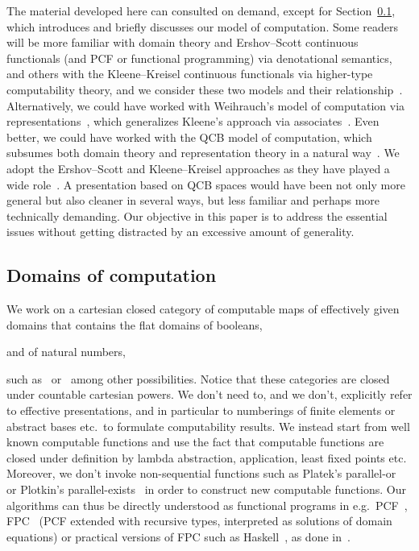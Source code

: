 \documentclass{LMCS}
\begin{document}
The material developed here can consulted on demand, except for
Section~\ref{domains}, which introduces and briefly discusses our
model of computation. Some readers will be more familiar with domain
theory and Ershov--Scott continuous functionals (and PCF or functional
programming) via denotational semantics, and others with the
Kleene--Kreisel continuous functionals via higher-type computability
theory, and we consider these two models and their
relationship~\cite{normann:computer}.  Alternatively, we could have
worked with Weihrauch's model of computation via
representations~\cite{weihrauch:analysis}, which generalizes Kleene's
approach via associates~\cite{normann:recursion}.  Even better, we
could have worked with the QCB model of computation, which subsumes
both domain theory and representation theory in a natural
way~\cite{MR2328287,MR1948051}. We adopt the Ershov--Scott and
Kleene--Kreisel approaches as they have played a wide
role~\cite{normann:computer}. A presentation based on QCB spaces would
have been not only more general but also cleaner in several ways, but
less familiar and perhaps more technically demanding.  Our objective
in this paper is to address the essential issues without getting
distracted by an excessive amount of generality.

\subsection{Domains of computation} \label{domains}

We work on a cartesian closed category of computable maps of
effectively given domains that contains the flat domains of booleans,

and of natural numbers, 
 
such as~\cite{egli:constable} or~\cite{smyth:effectively} among other
possibilities. Notice that these categories are closed under countable
cartesian powers. We don't need to, and we don't, explicitly refer to
effective presentations, and in particular to numberings of finite
elements or abstract bases etc.\ to formulate computability results.
We instead start from well known computable functions and use the fact
that computable functions are closed under definition by lambda
abstraction, application, least fixed points etc.  Moreover, we don't
invoke non-sequential functions such as Platek's
parallel-or~\cite{scott:lcf} or Plotkin's
parallel-exists~\cite{plotkin:lcf} in order to construct new
computable functions. Our algorithms can thus be directly understood
as functional programs in e.g.\ PCF~\cite{plotkin:lcf},
FPC~\cite{plotkin:domains} (PCF extended with recursive types,
interpreted as solutions of domain equations) or practical versions of
FPC such as Haskell~\cite{bird,haskell:hutton}, as done
in~\cite{escardo:lics07}.
\end{document}
